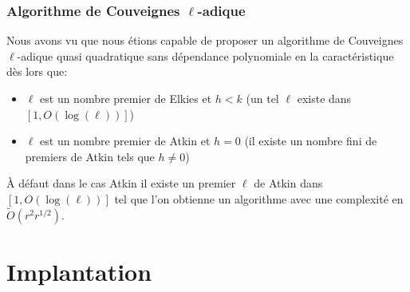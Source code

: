 \documentclass[10pt,a4paper]{beamer}
\theoremstyle{plain}
\theoremstyle{definition}
\theoremstyle{definition}
\theoremstyle{definition}
\theoremstyle{definition}
\theoremstyle{remark}
\theoremstyle{remark}
\begin{document}
\begin{frame}
\frametitle{Algorithme de Couveignes $\ell$-adique}
Nous avons vu que nous étions capable de proposer un algorithme de Couveignes $\ell$-adique quasi quadratique sans dépendance polynomiale en la caractéristique dès lors que:
\begin{itemize}
\item $\ell$ est un nombre premier de Elkies et $h<k$ (un tel $\ell$ existe dans $[1, O(\log(\ell))]$)
\item $\ell$ est un nombre premier de Atkin et $h=0$ (il existe un nombre fini de premiers de Atkin tels que $h \neq 0$) 
\end{itemize}
\`A défaut dans le cas Atkin il existe un premier $\ell$ de Atkin dans $[1, O(\log(\ell))]$ tel que l'on obtienne un algorithme avec une complexité en $\tilde{O}(r^{2}r^{1/2})$. %

\end{frame}

\section{Implantation}
\end{document}
